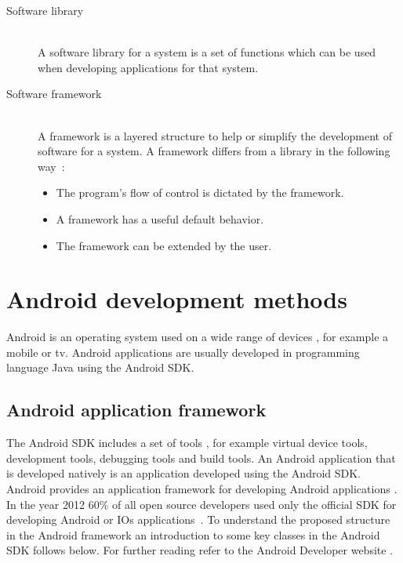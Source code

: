 \begin{description}
\item[Software library] \hfill \\
	A software library for a system is a set of functions which can be used when developing applications for that system.
\item[Software framework] \hfill \\
	A framework is a layered structure to help or simplify the development of software for a system. A framework differs from a library in the following way~\cite{riehle2000}:
\begin{itemize}
\item The program's flow of control is dictated by the framework.
\item A framework has a useful default behavior.
\item The framework can be extended by the user.
\end{itemize}
\end{description}

\section{Android development methods}\label{sec:android-development-methods}
Android is an operating system used on a wide range of devices \cite{dell2011}, for example a mobile or tv. Android applications are usually developed in programming language Java using the Android SDK.

\subsection{Android application framework} \label{subsec:android-application-framework}
The Android SDK includes a set of tools \cite{sdk2015}, for example virtual device tools, development tools, debugging tools and build tools. An Android application that is developed natively is an application developed using the Android SDK. Android provides an application framework for developing Android applications \cite{android-framework2015}. In the year 2012 60\% of all open source developers used only the official SDK for developing Android or IOs applications~\cite{eclipse2012}. To understand the proposed structure in the Android framework an introduction to some key classes in the Android SDK follows below. For further reading refer to the Android Developer website \cite{androiddevelopers2015}.

